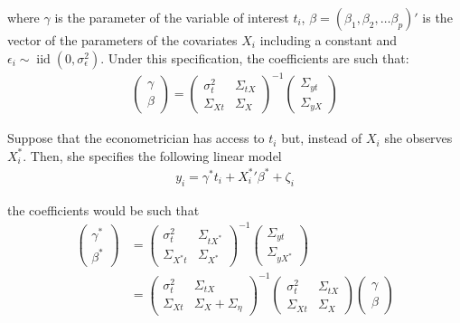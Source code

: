 \documentclass[12pt]{article}
\def\b{\beta}
\def\g{\gamma}
\begin{document}
        where $\g$ is the parameter of the variable of interest $t_i$, $\b=(\b_1,\b_2,\dots \b_p)'$ is the vector of the parameters of the covariates $X_i$ including a constant and $\epsilon_i \sim \operatorname{iid}(0,\sigma^2_\epsilon)$. Under this specification, the coefficients are such that:
        \begin{align}
            \left(\begin{array}{l}
        {\gamma} \\
        {\beta}
        \end{array}\right)=\left(\begin{array}{cc}
        {\sigma}^2_{t} & \Sigma_{tX} \\
        \Sigma_{Xt} & {\Sigma}_{X}
        \end{array}\right)^{-1}\left(\begin{array}{c}
        \Sigma_{yt} \\
        \Sigma_{yX}
        \end{array}\right)
        \end{align}

        Suppose that the econometrician has access to $t_i$ but, instead of $X_i$ she observes $X^*_i$. Then, she specifies the following linear model
        \begin{align}
            y_i = \gamma^* t_i + {X^{*}_i}' \beta^* + \zeta_i
        \end{align}

        the coefficients would be such that
        \begin{align}
            \left(\begin{array}{l}
        {\gamma}^* \\
        {\beta}^*
        \end{array}\right)&=\left(\begin{array}{cc}
        {\sigma}^2_{t} & \Sigma_{tX^*} \\
        \Sigma_{X^*t} & {\Sigma}_{X^*}
        \end{array}\right)^{-1}\left(\begin{array}{c}
        \Sigma_{yt} \\
        \Sigma_{yX^*}
        \end{array}\right) \\
        & =\left(\begin{array}{cc}
        {\sigma}^2_{t} & \Sigma_{tX} \\
        \Sigma_{Xt} & {\Sigma}_{X}+{\Sigma}_{\eta}
        \end{array}\right)^{-1}\left(\begin{array}{cc}
        {\sigma}^2_{t} & \Sigma_{tX} \\
        \Sigma_{Xt} & {\Sigma}_{X}
        \end{array}\right)\left(\begin{array}{l}
        {\gamma} \\
        {\beta}
        \end{array}\right)
        \end{align}
\end{document}
